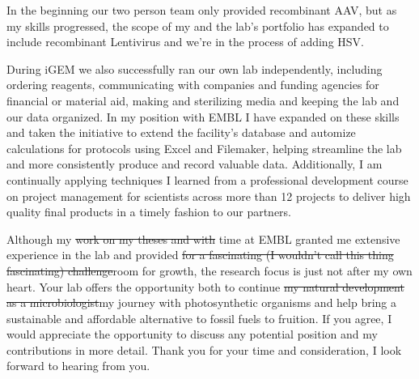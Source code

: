 \documentclass[11pt,a4paper,sans]{moderncv}
\begin{document}
\begin{spacing}{1.15}
In the beginning our two person team only provided recombinant AAV, but as my skills progressed, the scope of my and the lab's portfolio has expanded to include recombinant Lentivirus and we're in the process of adding HSV.\par

During iGEM we also successfully ran our own lab independently, including ordering reagents, communicating with companies and funding agencies for financial or material aid, making and sterilizing media and keeping the lab and our data organized. 
In my position with EMBL I have expanded on these skills and taken the initiative to extend the facility's database and automize calculations for protocols using Excel and Filemaker, helping streamline the lab and more consistently produce and record valuable data.
Additionally, I am continually applying techniques I learned from a professional development course on project management for scientists across more than 12 projects to deliver high quality final products in a timely fashion to our partners.
\par

Although my \sout{work on my theses and with} time at EMBL granted me extensive experience in the lab and provided \sout{for a fascinating (I wouldn't call this thing fascinating) challenge}room for growth, the research focus is just not after my own heart.
Your lab offers the opportunity both to continue \sout{my natural development as a microbiologist}my journey with photosynthetic organisms and help bring a sustainable and affordable alternative to fossil fuels to fruition. 
If you agree, I would appreciate the opportunity to discuss any potential position and my contributions in more detail. 
Thank you for your time and consideration, I look forward to hearing from you.


 

\end{spacing}
\makeletterclosing
\end{document}
